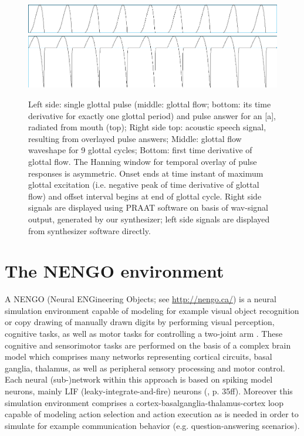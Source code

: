 \documentclass[conference]{IEEEtran}
\begin{document}
\begin{figure}[!t]
\begin{minipage}[b]{0.8\columnwidth}
    \includegraphics[width=\textwidth]{signal3}\\
    \includegraphics[width=\textwidth]{signal4}
  \end{minipage}
  \caption{Left side: single glottal pulse (middle: glottal flow;
    bottom: its time derivative for exactly one glottal period) and
    pulse answer for an [a], radiated from mouth (top); Right side
    top: acoustic speech signal, resulting from overlayed pulse
    answers; Middle: glottal flow waveshape for 9 glottal cycles;
    Bottom: first time derivative of glottal flow. The Hanning window
    for temporal overlay of pulse responses is asymmetric. Onset ends
    at time instant of maximum glottal excitation (i.e. negative peak
    of time derivative of glottal flow) and offset interval begins at
    end of glottal cycle. Right side signals are displayed using PRAAT
    software on basis of wav-signal output, generated by our
    synthesizer; left side signals are displayed from synthesizer
    software directly.}
\label{fig:signal}
\end{figure}

\section{The NENGO environment}

A NENGO (Neural ENGineering Objects; see \url{http://nengo.ca/}) is a
neural simulation environment capable of modeling for example visual
object recognition or copy drawing of manually drawn digits by
performing visual perception, cognitive tasks, as well as motor tasks
for controlling a two-joint arm \cite{eliasmith2012,eliasmith2013}.
These cognitive and sensorimotor tasks are performed on the basis of a
complex brain model which comprises many networks representing
cortical circuits, basal ganglia, thalamus, as well as peripheral
sensory processing and motor control. Each neural (sub-)network within
this approach is based on spiking model neurons, mainly LIF
(leaky-integrate-and-fire) neurons (\cite{eliasmith2013}, p. 35ff).
Moreover this simulation environment comprises a
cortex-basalganglia-thalamus-cortex loop capable of modeling action
selection and action execution as is needed in order to simulate for
example communi­cation behavior (e.g. question-answering scenarios).
\end{document}
